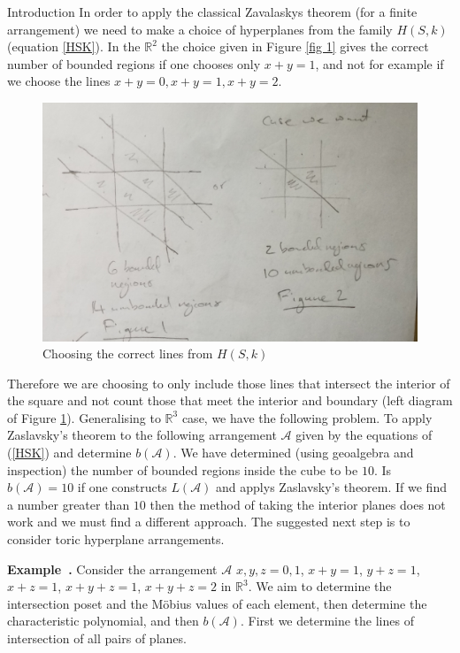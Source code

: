 \documentclass[a4paper,12pt]{article}
\newcounter{example}[]
\newenvironment{example}[1][]{\refstepcounter{example}\par\medskip
   \noindent \textbf{Example~\theexample. #1} \rmfamily}{\medskip}
\theoremstyle{definition}
\theoremstyle{indented}
\begin{document}
\begin{section}{Introduction}
 In order to apply the classical Zavalaskys theorem (for a finite arrangement) we need to make a choice of hyperplanes from the family $H(S,k)$ (equation \ref{HSK}). In the $\mathbb{R}^2$ the choice given in Figure \ref{fig 1} gives the correct number of bounded regions if one chooses only $x+y=1$, and not for example if we choose the lines $x+y=0, x+y=1, x+y=2$.
 
 \begin{figure}[H]
    \centering
 \includegraphics[scale=0.15,angle=0]{29072020 pics/n=4 choice lines.jpg}  
    \caption{Choosing the correct lines from $H(S,k)$}
    \label{fig 6}
\end{figure}
 
 Therefore we are choosing to only include those lines that intersect the interior of the square and not count those that meet the interior and boundary (left diagram of Figure \ref{fig 6}). Generalising to $\mathbb{R}^3$ case, we have the following problem. 
 To apply Zaslavsky's theorem to the following arrangement $\mathcal{A}$ given by the equations of (\ref{HSK}) and determine $b(\mathcal{A})$. We have determined (using geoalgebra and inspection) the number of bounded regions inside the cube to be $10$. Is $b(\mathcal{A}) =10$ if one constructs $L(\mathcal{A})$ and applys Zaslavsky's theorem. If we find a number greater than $10$ then the method of taking the interior planes does not work and we must find a different approach. The suggested next step is to consider toric hyperplane arrangements. 
 
\begin{example}
Consider the arrangement $\mathcal{A}$ $x,y,z= 0,1$, $x+y=1$, $y+z=1$, $x+z=1$, $x+y+z=1$, $x+y+z=2$ in $\mathbb{R}^3$. We aim to determine the intersection poset and the Möbius values of each element, then determine the characteristic polynomial, and then $b(\mathcal{A})$. First we determine the lines of intersection of all pairs of planes.


\end{example}
\end{section}
\end{document}

